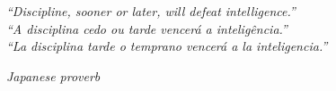 \begin{epigrafe}
	\vspace*{\fill}
\begin{flushright}
\begin{minipage}{9.9cm}
\textit{``Discipline, sooner or later, will defeat intelligence.''\\
``A disciplina cedo ou tarde vencerá a inteligência.''\\
``La disciplina tarde o temprano vencerá a la inteligencia.''}
\end{minipage}
\end{flushright}

\begin{flushright}
\textit{Japanese proverb}
\end{flushright}
\end{epigrafe}


